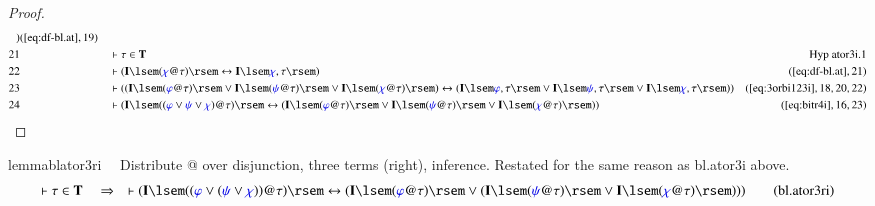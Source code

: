 \begin{proof}
\begin{align}
      )&(\mbox{\ref{eq:df-bl.at}},19)\notag
  \\ 21 &&  & \vdash \tau \in
      \mathbf{T}&\text{Hyp~ator3i.1}\notag
  \\ 22 &&  & \vdash ( \mathbf{I} \lsem ( \mw{\chi} @ \tau ) \rsem
      \leftrightarrow \mathbf{I} \lsem \mw{\chi} , \tau \rsem
      )&(\mbox{\ref{eq:df-bl.at}},21)\notag
  \\ 23 &&  & \vdash ( ( \mathbf{I} \lsem ( \mw{\varphi} @ \tau )
      \rsem \vee \mathbf{I} \lsem ( \mw{\psi} @ \tau ) \rsem \vee
      \mathbf{I} \lsem ( \mw{\chi} @ \tau ) \rsem ) \leftrightarrow (
      \mathbf{I} \lsem \mw{\varphi} , \tau \rsem \vee \mathbf{I} \lsem
      \mw{\psi} , \tau \rsem \vee \mathbf{I} \lsem \mw{\chi} , \tau
      \rsem ) )&(\mbox{\ref{eq:3orbi123i}},18,20,22)\notag
  \\ 24 &&  & \vdash ( \mathbf{I} \lsem ( ( \mw{\varphi} \vee
      \mw{\psi} \vee \mw{\chi} ) @ \tau ) \rsem \leftrightarrow (
      \mathbf{I} \lsem ( \mw{\varphi} @ \tau ) \rsem \vee \mathbf{I}
      \lsem ( \mw{\psi} @ \tau ) \rsem \vee \mathbf{I} \lsem (
      \mw{\chi} @ \tau ) \rsem )
      )&(\mbox{\ref{eq:bitr4i}},16,23)\notag
\end{align}
\end{proof}

\begin{restatable}{lemma}{blator3ri}~~ Distribute @ over disjunction, three
terms (right), inference.  Restated for the same reason as bl.ator3i above.
\begin{align}
\vdash \tau \in \mathbf{T}\quad\Rightarrow\quad \vdash ( \mathbf{I} \lsem ( (
    \mw{\varphi} \vee ( \mw{\psi} \vee \mw{\chi} ) ) @ \tau ) \rsem
    \leftrightarrow ( \mathbf{I} \lsem ( \mw{\varphi} @ \tau ) \rsem \vee (
    \mathbf{I} \lsem ( \mw{\psi} @ \tau ) \rsem \vee \mathbf{I} \lsem (
    \mw{\chi} @ \tau ) \rsem ) ) )\label{eq:bl.ator3ri}\tag{bl.ator3ri}
\end{align}
\end{restatable}

